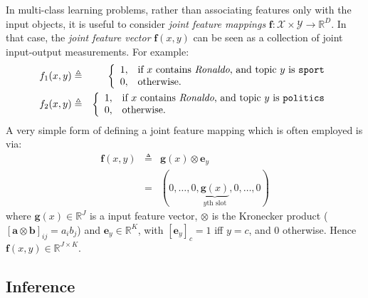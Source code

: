 In multi-class learning problems, rather than associating features only with the input objects, 
it is useful to consider \emph{joint feature mappings} $\boldsymbol{f}:\mathcal{X}\times \mathcal{Y}\rightarrow \mathbb{R}^D$. 
In that case, the \emph{joint feature vector}  $\boldsymbol{f}(x,y)$ can be seen as a collection of joint input-output measurements. 
For example: 
\begin{eqnarray}
f_1(x,y) &\triangleq& 
\left\{
\begin{array}{ll}
1, & \text{if $x$ contains \emph{Ronaldo}, and topic $y$ is {\tt sport}}\\
0, & \text{otherwise.}
\end{array}
\right.\\
f_2(x,y) &\triangleq& 
\left\{
\begin{array}{ll}
1, & \text{if $x$ contains \emph{Ronaldo}, and topic $y$ is {\tt politics}}\\
0, & \text{otherwise.}
\end{array}
\right.
\end{eqnarray}  
A very simple form of defining a joint feature mapping which is often employed is via: 
\begin{eqnarray}\label{eq:jointfeatsimple}
\boldsymbol{f}(x,y) &\triangleq& \boldsymbol{g}(x) \otimes \boldsymbol{e}_y\nonumber\\
&=& (0,\ldots,0,\underbrace{\boldsymbol{g}(x)}_{\text{$y$th slot}},0,\ldots,0)
\end{eqnarray}
where $\boldsymbol{g}(x) \in \mathbb{R}^J$ is a input feature vector, $\otimes$ is the Kronecker product 
($[\boldsymbol{a} \otimes \boldsymbol{b}]_{ij} = a_i b_j$) and 
$\boldsymbol{e}_y \in \mathbb{R}^{K}$, with $[\boldsymbol{e}_y]_c = 1$ iff $y=c$, and 
$0$ otherwise. Hence $\boldsymbol{f}(x,y) \in \mathbb{R}^{J \times K}$.


\subsection{Inference}





